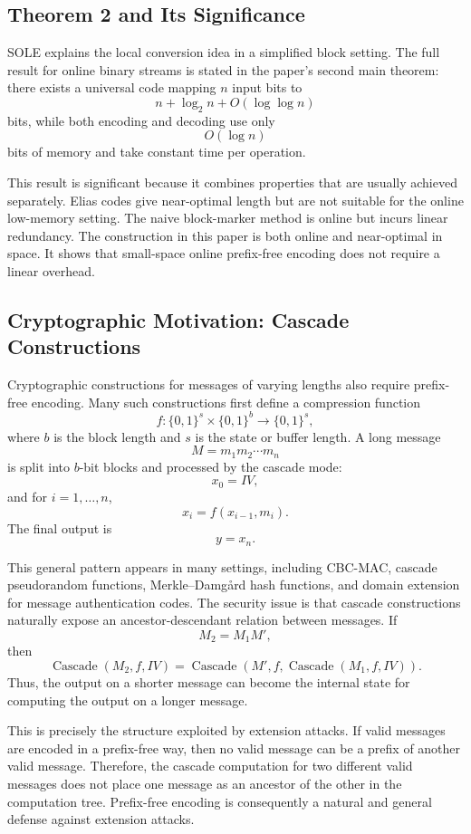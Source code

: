 \subsection{Theorem 2 and Its Significance}

SOLE explains the local conversion idea in a simplified block setting. The full result for online binary streams is stated in the paper's second main theorem: there exists a universal code mapping \(n\) input bits to
\[
    n + \log_2 n + O(\log\log n)
\]
bits, while both encoding and decoding use only
\[
    O(\log n)
\]
bits of memory and take constant time per operation.

This result is significant because it combines properties that are usually achieved separately. Elias codes give near-optimal length but are not suitable for the online low-memory setting. The naive block-marker method is online but incurs linear redundancy. The construction in this paper is both online and near-optimal in space. It shows that small-space online prefix-free encoding does not require a linear overhead.

\subsection{Cryptographic Motivation: Cascade Constructions}

Cryptographic constructions for messages of varying lengths also require prefix-free encoding. Many such constructions first define a compression function
\[
    f : \{0,1\}^s \times \{0,1\}^b \to \{0,1\}^s,
\]
where \(b\) is the block length and \(s\) is the state or buffer length. A long message
\[
    M = m_1m_2\cdots m_n
\]
is split into \(b\)-bit blocks and processed by the cascade mode:
\[
    x_0 = IV,
\]
and for \(i = 1,\ldots,n\),
\[
    x_i = f(x_{i-1},m_i).
\]
The final output is
\[
    y = x_n.
\]

This general pattern appears in many settings, including CBC-MAC, cascade pseudorandom functions, Merkle--Damg{\aa}rd hash functions, and domain extension for message authentication codes. The security issue is that cascade constructions naturally expose an ancestor-descendant relation between messages. If
\[
    M_2 = M_1M',
\]
then
\[
    \operatorname{Cascade}(M_2,f,IV)
    =
    \operatorname{Cascade}(M',f,\operatorname{Cascade}(M_1,f,IV)).
\]
Thus, the output on a shorter message can become the internal state for computing the output on a longer message.

This is precisely the structure exploited by extension attacks. If valid messages are encoded in a prefix-free way, then no valid message can be a prefix of another valid message. Therefore, the cascade computation for two different valid messages does not place one message as an ancestor of the other in the computation tree. Prefix-free encoding is consequently a natural and general defense against extension attacks.

